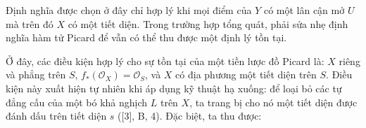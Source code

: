  Định nghĩa được chọn ở đây chỉ hợp lý khi mọi điểm của
$Y$ có một lân cận mở $U$ mà trên đó $X$ có một tiết diện. Trong trường hợp
tổng quát, phải sửa nhẹ định nghĩa hàm tử Picard để vẫn có thể thu được một
định lý tồn tại.

Ở đây, các điều kiện hợp lý cho sự tồn tại của một tiền lược đồ Picard là:
$X$ riêng và phẳng trên $S$, $f_*(\mathcal O_X)=\mathcal O_S$, và $X$ có địa
phương một tiết diện trên $S$. Điều kiện này xuất hiện tự nhiên khi áp dụng kỹ
thuật hạ xuống: để loại bỏ các tự đẳng cấu của một bó khả nghịch $L$ trên $X$,
ta trang bị cho nó một tiết diện được đánh dấu trên tiết diện $s$ ([3], B, 4).
Đặc biệt, ta thu được:

